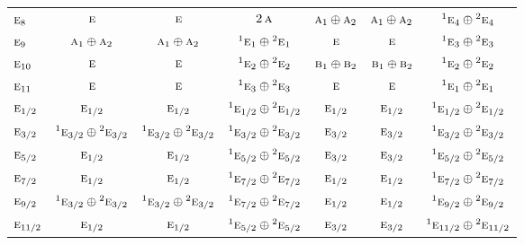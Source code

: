 \documentclass[10pt,a4paper]{article}
\numberwithin{equation}{section}
\newcommand{\irr}[1]{\text{\normalfont\scshape #1}}
\newcommand{\conjpair}[1]{{}^{#1}}
\begin{document}
{\begin{longtable}{@{}lcccccc@{}}
$\irr{e}_{8}$ & $\irr{e}$ & $\irr{e}$ & $2\,\irr{a}$ & $\irr{a}_{1}\oplus \irr{a}_{2}$ & $\irr{a}_{1}\oplus \irr{a}_{2}$ & $\conjpair{1}\irr{e}_{4}\oplus \conjpair{2}\irr{e}_{4}$\\
$\irr{e}_{9}$ & $\irr{a}_{1}\oplus \irr{a}_{2}$ & $\irr{a}_{1}\oplus \irr{a}_{2}$ & $\conjpair{1}\irr{e}_{1}\oplus \conjpair{2}\irr{e}_{1}$ & $\irr{e}$ & $\irr{e}$ & $\conjpair{1}\irr{e}_{3}\oplus \conjpair{2}\irr{e}_{3}$\\
$\irr{e}_{10}$ & $\irr{e}$ & $\irr{e}$ & $\conjpair{1}\irr{e}_{2}\oplus \conjpair{2}\irr{e}_{2}$ & $\irr{b}_{1}\oplus \irr{b}_{2}$ & $\irr{b}_{1}\oplus \irr{b}_{2}$ & $\conjpair{1}\irr{e}_{2}\oplus \conjpair{2}\irr{e}_{2}$\\
$\irr{e}_{11}$ & $\irr{e}$ & $\irr{e}$ & $\conjpair{1}\irr{e}_{3}\oplus \conjpair{2}\irr{e}_{3}$ & $\irr{e}$ & $\irr{e}$ & $\conjpair{1}\irr{e}_{1}\oplus \conjpair{2}\irr{e}_{1}$\\
$\irr{e}_{1/2}$ & $\irr{e}_{1/2}$ & $\irr{e}_{1/2}$ & $\conjpair{1}\irr{e}_{1/2}\oplus \conjpair{2}\irr{e}_{1/2}$ & $\irr{e}_{1/2}$ & $\irr{e}_{1/2}$ & $\conjpair{1}\irr{e}_{1/2}\oplus \conjpair{2}\irr{e}_{1/2}$\\
$\irr{e}_{3/2}$ & $\conjpair{1}\irr{e}_{3/2}\oplus \conjpair{2}\irr{e}_{3/2}$ & $\conjpair{1}\irr{e}_{3/2}\oplus \conjpair{2}\irr{e}_{3/2}$ & $\conjpair{1}\irr{e}_{3/2}\oplus \conjpair{2}\irr{e}_{3/2}$ & $\irr{e}_{3/2}$ & $\irr{e}_{3/2}$ & $\conjpair{1}\irr{e}_{3/2}\oplus \conjpair{2}\irr{e}_{3/2}$\\
$\irr{e}_{5/2}$ & $\irr{e}_{1/2}$ & $\irr{e}_{1/2}$ & $\conjpair{1}\irr{e}_{5/2}\oplus \conjpair{2}\irr{e}_{5/2}$ & $\irr{e}_{3/2}$ & $\irr{e}_{3/2}$ & $\conjpair{1}\irr{e}_{5/2}\oplus \conjpair{2}\irr{e}_{5/2}$\\
$\irr{e}_{7/2}$ & $\irr{e}_{1/2}$ & $\irr{e}_{1/2}$ & $\conjpair{1}\irr{e}_{7/2}\oplus \conjpair{2}\irr{e}_{7/2}$ & $\irr{e}_{1/2}$ & $\irr{e}_{1/2}$ & $\conjpair{1}\irr{e}_{7/2}\oplus \conjpair{2}\irr{e}_{7/2}$\\
$\irr{e}_{9/2}$ & $\conjpair{1}\irr{e}_{3/2}\oplus \conjpair{2}\irr{e}_{3/2}$ & $\conjpair{1}\irr{e}_{3/2}\oplus \conjpair{2}\irr{e}_{3/2}$ & $\conjpair{1}\irr{e}_{7/2}\oplus \conjpair{2}\irr{e}_{7/2}$ & $\irr{e}_{1/2}$ & $\irr{e}_{1/2}$ & $\conjpair{1}\irr{e}_{9/2}\oplus \conjpair{2}\irr{e}_{9/2}$\\
$\irr{e}_{11/2}$ & $\irr{e}_{1/2}$ & $\irr{e}_{1/2}$ & $\conjpair{1}\irr{e}_{5/2}\oplus \conjpair{2}\irr{e}_{5/2}$ & $\irr{e}_{3/2}$ & $\irr{e}_{3/2}$ & $\conjpair{1}\irr{e}_{11/2}\oplus \conjpair{2}\irr{e}_{11/2}$\\

\end{longtable}}
\end{document}
